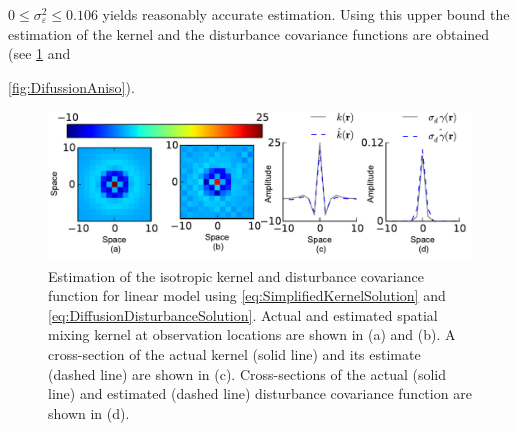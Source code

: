 \documentclass[10pt,twocolumn,twoside]{IEEEtran}
\begin{document}
$0\le\sigma_{\varepsilon}^2\le 0.106$ yields reasonably accurate estimation. Using this upper bound the estimation of the kernel and the disturbance covariance functions are obtained (see \figurename{\ref{fig:DiffusionIso}} and \figurename{\ref{fig:DifussionAniso}). 
\begin{figure}[h]
	\centering
		\includegraphics[scale=1]{./Graph/DisturbanceKernelEstimationLineariso.pdf}
	\caption{Estimation of the isotropic kernel and disturbance covariance function for linear model using \eqref{eq:SimplifiedKernelSolution} and \eqref{eq:DiffusionDisturbanceSolution}. Actual and  estimated spatial mixing kernel at observation locations are shown in (a) and (b).  A cross-section of the actual kernel (solid line) and its estimate  (dashed line) are shown in (c). Cross-sections of the actual (solid line) and estimated (dashed line) disturbance covariance function are shown in (d).}
	\label{fig:DiffusionIso} 
	\end{figure}
	
}
\end{document}
